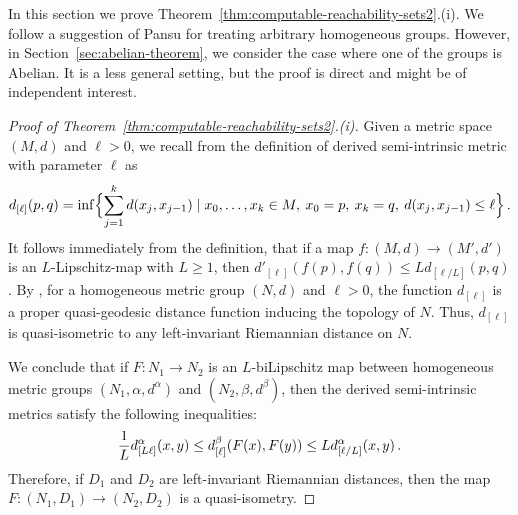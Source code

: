 \documentclass[a4paper,12pt]{amsart}
\theoremstyle{plain}
\theoremstyle{definition}
\theoremstyle{plain}
\theoremstyle{remark}
\begin{document}
In this section we prove Theorem~\ref{thm:computable-reachability-sets2}.(i). We follow a suggestion of Pansu for treating arbitrary homogeneous groups.
However, in Section~\ref{sec:abelian-theorem}, we consider the case where one of the groups is Abelian. 
It is a less general setting, but the proof is direct and might be of independent interest.


\begin{proof}[Proof of Theorem~\ref{thm:computable-reachability-sets2}.(i)]
		Given a metric space \( (M,d) \) and \( \ell > 0 \), we recall from \cite{avain:CKLNO} the definition of derived semi-intrinsic metric with parameter \( \ell \) as
	\begin{equation*}
	d_{[\ell]}(p,q) = \inf \Bigl\{ \sum_{j=1}^k d(x_j,x_{j-1}) \mid x_0,\ldots,x_k \in M,\: x_0=p,\: x_k=q,\: d(x_j,x_{j-1}) \le \ell \Bigr\} \,.
	\end{equation*}
	It follows immediately from the definition, that if a map \( f \colon (M,d) \to (M',d') \) is an \(L\)-Lipschitz-map with \( L \ge 1 \), then \( d'_{[\ell]}(f(p),f(q)) \le L d_{[\ell/L]}(p,q) \).
	By \cite[Lemma 2.3]{avain:CKLNO}, for a homogeneous metric group \( (N,d) \) and \( \ell > 0 \), the function \( d_{[\ell]} \) is a proper quasi-geodesic distance function inducing the topology of \( N \). Thus, \( d_{[\ell]} \) is quasi-isometric to any left-invariant Riemannian distance on \(N\).
	
	We conclude that if \( F \colon N_1 \to N_2 \) is an \(L\)-biLipschitz map between homogeneous metric groups \( (N_1,\alpha,d^\alpha) \) and \( (N_2,\beta,d^\beta) \), then
	 the derived semi-intrinsic metrics satisfy the following inequalities:
	\begin{equation*}
	\frac{1}{L} d_{[L \ell]}^\alpha (x,y) \le d_{[\ell]}^\beta (F(x),F(y)) \le L d_{[\ell/L]}^\alpha (x,y) \,.
	\end{equation*}
Therefore, if \( D_1\) and \( D_2\) are left-invariant Riemannian distances, then the map \linebreak \( F \colon (N_1,D_1) \to (N_2,D_2) \) is a quasi-isometry.
\end{proof}
\end{document}
